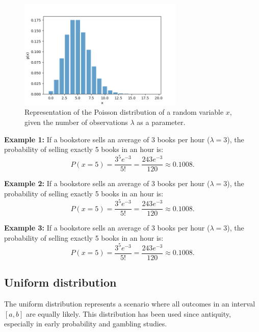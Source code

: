 \documentclass{book}
\begin{document}
\begin{figure}[ht]
    \centering
    \includegraphics[width=0.7\textwidth]{figures/chapter2/poisson.png}
    \caption{Representation of the Poisson distribution of a random variable $x$, given the number of observations $\lambda$ as a parameter.}
    \label{fig:random}
\end{figure}

\textbf{Example 1:} If a bookstore sells an average of 3 books per hour ($\lambda = 3$), the probability of selling exactly 5 books in an hour is:
\begin{equation}
    P(x=5) = \frac{3^5 e^{-3}}{5!} = \frac{243 e^{-3}}{120} \approx 0.1008.
\end{equation}

\textbf{Example 2:} If a bookstore sells an average of 3 books per hour ($\lambda = 3$), the probability of selling exactly 5 books in an hour is:
\begin{equation}
    P(x=5) = \frac{3^5 e^{-3}}{5!} = \frac{243 e^{-3}}{120} \approx 0.1008.
\end{equation}

\textbf{Example 3:} If a bookstore sells an average of 3 books per hour ($\lambda = 3$), the probability of selling exactly 5 books in an hour is:
\begin{equation}
    P(x=5) = \frac{3^5 e^{-3}}{5!} = \frac{243 e^{-3}}{120} \approx 0.1008.
\end{equation}

\newpage
\subsection{Uniform distribution}
The uniform distribution represents a scenario where all outcomes in an interval $[a, b]$ are equally likely. This distribution has been used since antiquity, especially in early probability and gambling studies.
\end{document}
